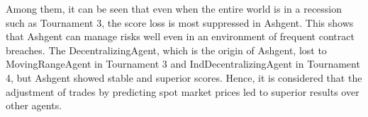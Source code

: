\documentclass[10pt]{article}
\begin{document}
Among them, it can be seen that even when the entire world is in a recession such as Tournament 3, the score loss is most suppressed in Ashgent.
This shows that Ashgent can manage risks well even in an environment of frequent contract breaches.
The DecentralizingAgent, which is the origin of Ashgent, lost to MovingRangeAgent in Tournament 3 and IndDecentralizingAgent in Tournament 4, but Ashgent showed stable and superior scores.
Hence, it is considered that the adjustment of trades by predicting spot market prices led to superior results over other agents.

\begin{table}[h]
    \caption{Score of Tournaments}
    \label{table:experiments}
    \centering
\end{table}

\end{document}
